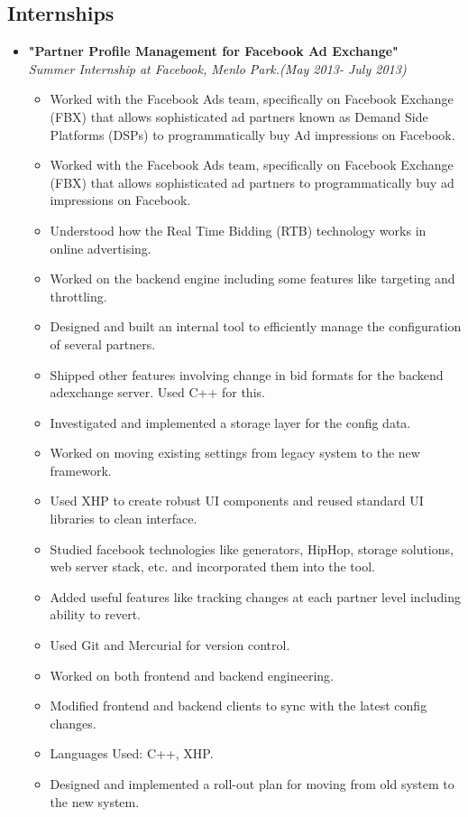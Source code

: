 \documentclass[margin,line]{resume}
\begin{document}
\begin{resume}
    \section{\mysidestyle Internships} 
    \begin{itemize}
    \item \large{\textbf{\textsf{"Partner Profile Management for Facebook Ad Exchange"}}}
      \\ \small{\textit{Summer Internship at Facebook, Menlo Park.(May 2013- July 2013)}}
      \normalsize
      \begin{itemize}
        \item Worked with the Facebook Ads team, specifically on Facebook Exchange (FBX) that allows sophisticated ad partners known as Demand Side Platforms (DSPs) to programmatically buy Ad impressions on Facebook.
        \item Worked with the Facebook Ads team, specifically on Facebook Exchange (FBX) that allows sophisticated ad partners to programmatically buy ad impressions on Facebook.
        \item Understood how the Real Time Bidding (RTB) technology works in online advertising.
        \item Worked on the backend engine including some features like targeting and throttling.
        \item Designed and built an internal tool to efficiently manage the configuration of several partners.
        \item Shipped other features involving change in bid formats for the backend adexchange server. Used C++ for this.
        \item Investigated and implemented a storage layer for the config data.
        \item Worked on moving existing settings from legacy system to the new framework.
          \newpage
        \item Used XHP to create robust UI components and reused standard UI libraries to clean interface.
        \item Studied facebook technologies like generators, HipHop, storage solutions, web server stack, etc. and incorporated them into the tool.
        \item Added useful features like tracking changes at each partner level including ability to revert.
        \item Used Git and Mercurial for version control.
        \item Worked on both frontend and backend engineering.
        \item Modified frontend and backend clients to sync with the latest config changes.
        \item Languages Used: C++, XHP.
        \item Designed and implemented a roll-out plan for moving from old system to the new system.
      \end{itemize}
    \end{itemize}


\end{resume}
\end{document}
